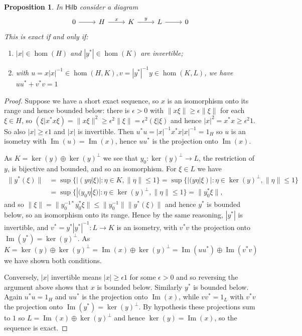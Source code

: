 \documentclass[a4paper,11pt]{article}
\theoremstyle{plain}
\newtheorem{proposition}{Proposition}[section]
\theoremstyle{remark}
\newcommand{\im}{{\operatorname{Im}}}
\newcommand{\catHilb}{\textsf{Hilb}}
\begin{document}
\begin{proposition}
In $\catHilb$ consider a diagram
\begin{equation}\notag%
\begin{tikzcd}
  0 \ar[r] &
  H \ar[r, "x"] &
  K \ar[r, "y"] &
  L \ar[r] &
  0
\end{tikzcd}
\end{equation}
This is exact if and only if:
\begin{enumerate}[(1)]
  \item $|x| \in \hom(H)$ and $|y^*|\in\hom(K)$ are invertible;
  \item with $u = x |x|^{-1} \in \hom(H,K), v = |y^*|^{-1}y \in \hom(K,L)$, we have $uu^* + v^*v = 1$
\end{enumerate}
\end{proposition}
\begin{proof}
Suppose we have a short exact sequence, so $x$ is an isomorphism onto its range and hence bounded below: there is $\epsilon>0$ with $\|x\xi\| \geq \epsilon \|\xi\|$ for each $\xi\in H$, so $(\xi|x^*x\xi) = \|x\xi\|^2 \geq \epsilon^2 \|\xi\| = \epsilon^2 (\xi|\xi)$ and hence $|x|^2 = x^*x \geq \epsilon^2 1$.  So also $|x| \geq \epsilon 1$ and $|x|$ is invertible.  Then $u^*u = |x|^{-1} x^*x |x|^{-1} = 1_H$ so $u$ is an isometry with $\im(u) = \im(x)$, hence $uu^*$ is the projection onto $\im(x)$.

As $K = \ker(y) \oplus \ker(y)^\perp$ we see that $y_0 \colon \ker(y)^\perp \to L$, the restriction of $y$, is bijective and bounded, and so an isomorphism.  For $\xi\in L$ we have
\begin{align*}
\|y^*(\xi)\| &= \sup\{ |(y\eta|\xi)| : \eta\in K, \|\eta\|\leq 1\}
= \sup\{ |(y\eta|\xi)| : \eta\in\ker(y)^\perp, \|\eta\|\leq 1\} \\
&= \sup\{ |(y_0\eta|\xi)| : \eta\in\ker(y)^\perp, \|\eta\|\leq 1\}
= \|y_0^*\xi\|,
\end{align*}
and so $\|\xi\| = \|y_0^{-1 *} y_0^* \xi\| \leq \|y_0^{-1}\| \|y^*(\xi)\|$ and hence $y^*$ is bounded below, so an isomorphism onto its range.  Hence by the same reasoning, $|y^*|$ is invertible, and $v^* = y^*|y^*|^{-1} \colon L \to K$ is an isometry, with $v^*v$ the projection onto $\im(y^*) = \ker(y)^\perp$.
As $K = \ker(y) \oplus \ker(y)^\perp = \im(x) \oplus \ker(y)^\perp = \im(uu^*) \oplus \im(v^*v)$ we have shown both conditions.

Conversely, $|x|$ invertible means $|x| \geq \epsilon 1$ for some $\epsilon>0$ and so reversing the argument above shows that $x$ is bounded below.  Similarly $y^*$ is bounded below.  Again $u^*u = 1_H$ and $uu^*$ is the projection onto $\im(x)$, while $vv^*=1_L$ with $v^*v$ the projection onto $\im(y^*) = \ker(y)^\perp$.  By hypothesis these projections sum to $1$ so $L = \im(x) \oplus \ker(y)^\perp$ and hence $\ker(y) = \im(x)$, so the sequence is exact.
\end{proof}
\end{document}
